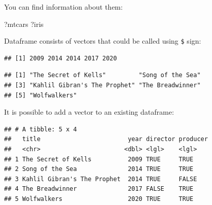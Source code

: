 \documentclass[
]{book}
\newenvironment{Shaded}{\begin{snugshade}}{\end{snugshade}}
\newcommand{\KeywordTok}[1]{\textcolor[rgb]{0.13,0.29,0.53}{\textbf{#1}}}
\newcommand{\NormalTok}[1]{#1}
\newcommand{\OperatorTok}[1]{\textcolor[rgb]{0.81,0.36,0.00}{\textbf{#1}}}
\newcommand{\OtherTok}[1]{\textcolor[rgb]{0.56,0.35,0.01}{#1}}
\newcommand{\StringTok}[1]{\textcolor[rgb]{0.31,0.60,0.02}{#1}}
\begin{document}
You can find information about them:

\begin{Shaded}
\begin{Highlighting}[]
\NormalTok{?mtcars}
\NormalTok{?iris}
\end{Highlighting}
\end{Shaded}

Dataframe consists of vectors that could be called using \texttt{\$} sign:

\begin{Shaded}
\end{Shaded}

\begin{verbatim}
## [1] 2009 2014 2014 2017 2020
\end{verbatim}

\begin{Shaded}
\end{Shaded}

\begin{verbatim}
## [1] "The Secret of Kells"         "Song of the Sea"            
## [3] "Kahlil Gibran's The Prophet" "The Breadwinner"            
## [5] "Wolfwalkers"
\end{verbatim}

It is possible to add a vector to an existing dataframe:

\begin{Shaded}
\end{Shaded}

\begin{verbatim}
## # A tibble: 5 x 4
##   title                        year director producer
##   <chr>                       <dbl> <lgl>    <lgl>   
## 1 The Secret of Kells          2009 TRUE     TRUE    
## 2 Song of the Sea              2014 TRUE     TRUE    
## 3 Kahlil Gibran's The Prophet  2014 TRUE     FALSE   
## 4 The Breadwinner              2017 FALSE    TRUE    
## 5 Wolfwalkers                  2020 TRUE     TRUE
\end{verbatim}
\end{document}
